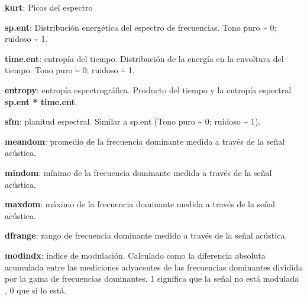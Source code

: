 \documentclass[
]{article}
\begin{document}
\vspace{6pt}

\textbf{kurt}: Picos del espectro

\vspace{6pt}

\textbf{sp.ent}: Distribución energética del espectro de frecuencias.
Tono puro \textasciitilde{} 0; ruidoso \textasciitilde{} 1.

\vspace{6pt}

\textbf{time.ent}: entropía del tiempo. Distribución de la energía en la
envoltura del tiempo. Tono puro \textasciitilde{} 0; ruidoso
\textasciitilde{} 1.

\vspace{6pt}

\textbf{entropy}: entropía espectrográfica. Producto del tiempo y la
entropía espectral \textbf{sp.ent * time.ent}.

\vspace{6pt}

\textbf{sfm}: planitud espectral. Similar a sp.ent (Tono puro
\textasciitilde{} 0; ruidoso \textasciitilde{} 1).

\vspace{6pt}

\textbf{meandom}: promedio de la frecuencia dominante medida a través de
la señal acústica.

\vspace{6pt}

\textbf{mindom}: mínimo de la frecuencia dominante medida a través de la
señal acústica.

\vspace{6pt}

\textbf{maxdom}: máximo de la frecuencia dominante medida a través de la
señal acústica.

\vspace{6pt}

\textbf{dfrange}: rango de frecuencia dominante medido a través de la
señal acústica.

\vspace{6pt}

\textbf{modindx}: índice de modulación. Calculado como la diferencia
absoluta acumulada entre las mediciones adyacentes de las frecuencias
dominantes dividida por la gama de frecuencias dominantes. 1 significa
que la señal no está modulada , 0 que sí lo está.

\vspace{6pt}
\end{document}
